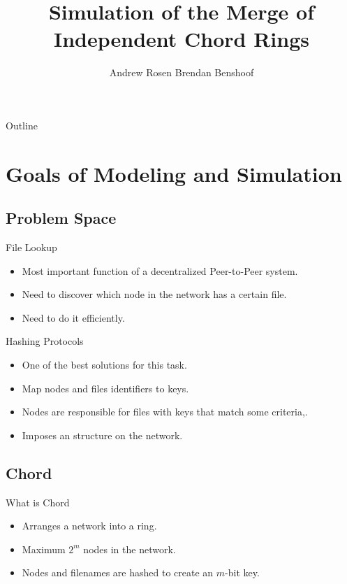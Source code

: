 \documentclass{beamer}
\title{Simulation of the Merge of Independent Chord Rings}
\author{Andrew Rosen \qquad Brendan Benshoof }
\date{} %
\begin{document}
\begin{frame}
  \titlepage
\end{frame}

\begin{frame}{Outline}
  \tableofcontents
\end{frame}

\section{Goals of Modeling and Simulation}

\subsection{Problem Space}

\begin{frame}{File Lookup}
	\begin{itemize}
		\item Most important function of a decentralized Peer-to-Peer system.
		\item Need to discover which node in the network has a certain file.
		\item Need to do it efficiently.
	\end{itemize}

\end{frame}


\begin{frame}{Hashing Protocols}
	\begin{itemize}
		\item One of the best solutions for this task.
		\item Map nodes and files identifiers to keys.
		\item Nodes are responsible for files with keys that match some criteria,.
		\item Imposes an structure on the network.
	\end{itemize}

\end{frame}


\subsection{Chord}

\begin{frame}{What is Chord}
	\begin{itemize}
		\item Arranges a network into a ring.
		\item Maximum $2^m$ nodes in the network.
		\item Nodes and filenames are hashed to create an $m$-bit key.
	\end{itemize}

\end{frame}
\end{document}
